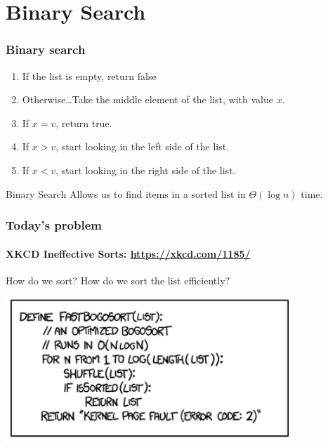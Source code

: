 \section{Binary Search}
\label{sec:binary_search}

\begin{frame}
	\frametitle{Binary search}
		\begin{enumerate}
		\item If the list is empty, return false
		\item Otherwise\dots Take the middle element of the list, with value $x$.
		\item If $x = v$, return true.
		\item If $x > v$, start looking in the left side of the list. 
		\item If $x < v$, start looking in the right side of the list.
		\end{enumerate}
		\pause
			\begin{block}{Binary Search}
				Allows us to find items in a \alert<3->{sorted} list in $\Theta(\log n)$ time.
			\end{block}	
\end{frame}

\begin{frame}
	\frametitle{Today's problem}
	\framesubtitle{XKCD Ineffective Sorts: \url{https://xkcd.com/1185/}}
	\begin{problemblock}{How do we sort?}
		How do we sort the list \alert<2>{efficiently}?
	\end{problemblock}
	\pause
	\begin{center}
		\includegraphics[width=0.8\textwidth]{figures/bogosort.png}\\
	\end{center}
\end{frame}

